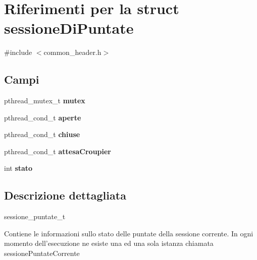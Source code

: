\hypertarget{structsessioneDiPuntate}{
\section{Riferimenti per la struct sessioneDiPuntate}
\label{structsessioneDiPuntate}
}


{\ttfamily \#include $<$common\_\-header.h$>$}

\subsection*{Campi}
\begin{DoxyCompactItemize}
\item 
\hypertarget{structsessioneDiPuntate_a0e0ecc3fc63fb11c966cc40a1b01516b}{
pthread\_\-mutex\_\-t {\bfseries mutex}}
\label{structsessioneDiPuntate_a0e0ecc3fc63fb11c966cc40a1b01516b}

\item 
\hypertarget{structsessioneDiPuntate_a483a18bd757244302c44bf95e8e0e218}{
pthread\_\-cond\_\-t {\bfseries aperte}}
\label{structsessioneDiPuntate_a483a18bd757244302c44bf95e8e0e218}

\item 
\hypertarget{structsessioneDiPuntate_a51eedb9500c475edb7f37264f54df5a4}{
pthread\_\-cond\_\-t {\bfseries chiuse}}
\label{structsessioneDiPuntate_a51eedb9500c475edb7f37264f54df5a4}

\item 
\hypertarget{structsessioneDiPuntate_afaf6d58ca7c5c43d30e9a0033d0db6d9}{
pthread\_\-cond\_\-t {\bfseries attesaCroupier}}
\label{structsessioneDiPuntate_afaf6d58ca7c5c43d30e9a0033d0db6d9}

\item 
\hypertarget{structsessioneDiPuntate_a46969519be0a35e43fcc24b1e3e65ccb}{
int {\bfseries stato}}
\label{structsessioneDiPuntate_a46969519be0a35e43fcc24b1e3e65ccb}

\end{DoxyCompactItemize}


\subsection{Descrizione dettagliata}
sessione\_\-puntate\_\-t

Contiene le informazioni sullo stato delle puntate della sessione corrente. In ogni momento dell'esecuzione ne esiste una ed una sola istanza chiamata sessionePuntateCorrente


